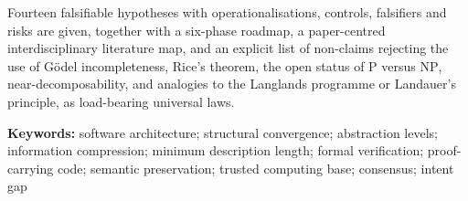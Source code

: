 \documentclass[11pt,a4paper,oneside,openany]{book}
\begin{document}
Fourteen falsifiable hypotheses with operationalisations, controls, falsifiers and risks are
given, together with a six-phase roadmap, a paper-centred interdisciplinary literature map,
and an explicit list of non-claims rejecting the use of G\"odel incompleteness, Rice's
theorem, the open status of $\mathrm{P}$ versus $\mathrm{NP}$, near-decomposability, and
analogies to the Langlands programme or Landauer's principle, as load-bearing universal
laws.

\vspace{1em}
\noindent\textbf{Keywords:} software architecture; structural convergence; abstraction
levels; information compression; minimum description length; formal verification;
proof-carrying code; semantic preservation; trusted computing base; consensus;
intent gap

\tableofcontents
\listoftables

\mainmatter














\appendix





\backmatter

\end{document}
